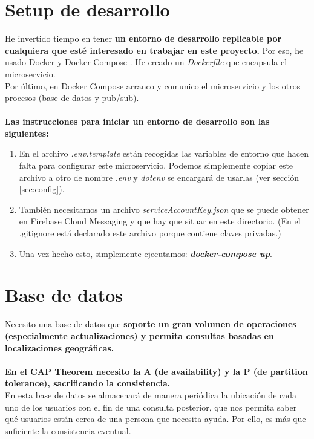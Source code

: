 \section{Setup de desarrollo}\label{sec:dev}

He invertido tiempo en tener \textbf{un entorno de desarrollo replicable por cualquiera que esté interesado en trabajar en este proyecto.}
Por eso, he usado Docker y Docker Compose \cite{docker}. He creado un \textit{Dockerfile} que encapsula el microservicio. 
\\ Por último, en Docker Compose arranco y comunico el microservicio y los otros procesos (base de datos y pub/sub). \\ \\
\textbf{Las instrucciones para iniciar un entorno de desarrollo son las siguientes:}

\begin{enumerate}
	\item En el archivo \textit{.env.template} están recogidas las variables de entorno que hacen falta para configurar este microservicio.
Podemos simplemente copiar este archivo a otro de nombre \textit{.env} y \textit{dotenv} se encargará de usarlas (ver sección \ref{sec:config}).
\item También necesitamos un archivo \textit{serviceAccountKey.json} que se puede obtener en Firebase Cloud Messaging \cite{firebase} y que hay que situar en este directorio. 
(En el .gitignore está declarado este archivo porque contiene claves privadas.)
\item Una vez hecho esto, simplemente ejecutamos: \textbf{\textit{docker-compose up}}.
\end{enumerate}

\section{Base de datos}

Necesito una base de datos que \textbf{soporte un gran volumen de operaciones (especialmente actualizaciones) y permita consultas basadas en localizaciones geográficas.} \\ \\
\textbf{En el CAP Theorem \cite{cap} necesito la A (de availability) y la P (de partition tolerance), sacrificando la consistencia.}
\\
En esta base de datos se almacenará de manera periódica la ubicación de cada uno de los usuarios con el fin de una consulta posterior, que nos permita saber qué usuarios
están cerca de una persona que necesita ayuda. Por ello, es más que suficiente la consistencia eventual.

